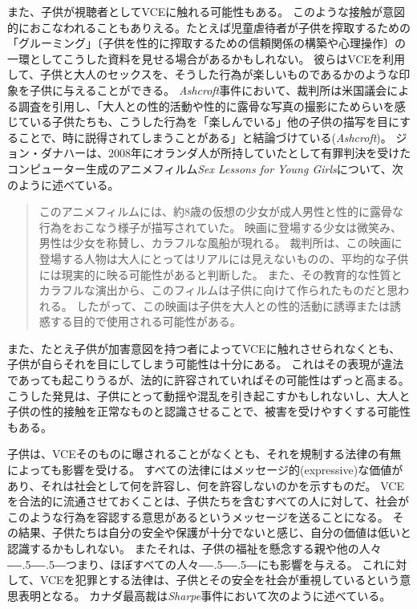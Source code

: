 \documentclass[paper=a4,book,openany]{jlreq}
\def\DDASH{―\kern-.5\zw―\kern-.5\zw―}
\begin{document}
また、子供が視聴者としてVCEに触れる可能性もある。
このような接触が意図的におこなわれることもありえる。たとえば児童虐待者が子供を搾取するための「グルーミング」〔子供を性的に搾取するための信頼関係の構築や心理操作〕の一環としてこうした資料を見せる場合があるかもしれない。
彼らはVCEを利用して、子供と大人のセックスを、そうした行為が楽しいものであるかのような印象を子供に与えることができる。
\emph{Ashcroft}事件において、裁判所は米国議会による調査を引用し、「大人との性的活動や性的に露骨な写真の撮影にためらいを感じている子供たちも、こうした行為を「楽しんでいる」他の子供の描写を目にすることで、時に説得されてしまうことがある」と結論づけている(\emph{Ashcroft})。
ジョン・ダナハーは、2008年にオランダ人が所持していたとして有罪判決を受けたコンピューター生成のアニメフィルム\emph{Sex Lessons for Young Girls}について、次のように述べている。

\begin{quote}
このアニメフィルムには、約8歳の仮想の少女が成人男性と性的に露骨な行為をおこなう様子が描写されていた。
映画に登場する少女は微笑み、男性は少女を称賛し、カラフルな風船が現れる。
裁判所は、この映画に登場する人物は大人にとってはリアルには見えないものの、平均的な子供には現実的に映る可能性があると判断した。
また、その教育的な性質とカラフルな演出から、このフィルムは子供に向けて作られたものだと思われる。
したがって、この映画は子供を大人との性的活動に誘導または誘惑する目的で使用される可能性がある。\citep[pp.137--138]{strikwerda17:_legal_moral_implic_child_sex_robot}
\end{quote}

また、たとえ子供が加害意図を持つ者によってVCEに触れさせられなくとも、子供が自らそれを目にしてしまう可能性は十分にある。
これはその表現が違法であっても起こりうるが、法的に許容されていればその可能性はずっと高まる。
こうした発見は、子供にとって動揺や混乱を引き起こすかもしれないし、大人と子供の性的接触を正常なものと認識させることで、被害を受けやすくする可能性もある。

子供は、VCEそのものに曝されることがなくとも、それを規制する法律の有無によっても影響を受ける。
すべての法律にはメッセージ的(expressive)な価値があり、それは社会として何を許容し、何を許容しないのかを示すものだ。
VCEを合法的に流通させておくことは、子供たちを含むすべての人に対して、社会がこのような行為を容認する意思があるというメッセージを送ることになる。
その結果、子供たちは自分の安全や保護が十分でないと感じ、自分の価値は低いと認識するかもしれない。
またそれは、子供の福祉を懸念する親や他の人々{\DDASH}つまり、ほぼすべての人々{\DDASH}にも影響を与える。
これに対して、VCEを犯罪とする法律は、子供とその安全を社会が重視しているという意思表明となる。
カナダ最高裁は\emph{Sharpe}事件において次のように述べている。
\end{document}
